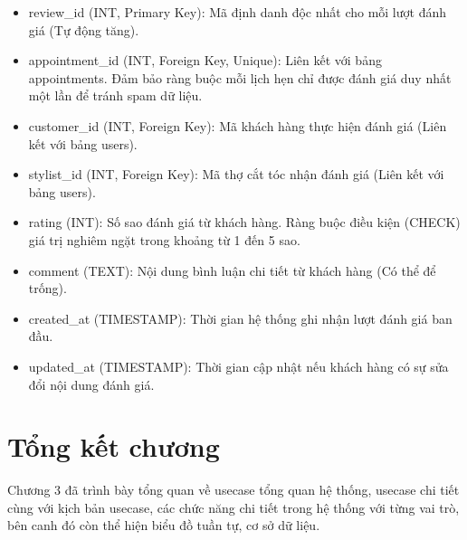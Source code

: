 \documentclass[../BTL.tex]{subfiles}
\begin{document}
\begin{itemize}
\item
  review\_id (INT, Primary Key): Mã định danh độc nhất cho mỗi lượt đánh
  giá (Tự động tăng).
\item
  appointment\_id (INT, Foreign Key, Unique): Liên kết với bảng
  appointments. Đảm bảo ràng buộc mỗi lịch hẹn chỉ được đánh giá duy
  nhất một lần để tránh spam dữ liệu.
\item
  customer\_id (INT, Foreign Key): Mã khách hàng thực hiện đánh giá
  (Liên kết với bảng users).
\item
  stylist\_id (INT, Foreign Key): Mã thợ cắt tóc nhận đánh giá (Liên
  kết với bảng users).
\item
  rating (INT): Số sao đánh giá từ khách hàng. Ràng buộc điều kiện
  (CHECK) giá trị nghiêm ngặt trong khoảng từ 1 đến 5 sao.
\item
  comment (TEXT): Nội dung bình luận chi tiết từ khách hàng (Có thể để
  trống).
\item
  created\_at (TIMESTAMP): Thời gian hệ thống ghi nhận lượt đánh giá
  ban đầu.
\item
  updated\_at (TIMESTAMP): Thời gian cập nhật nếu khách hàng có sự sửa
  đổi nội dung đánh giá.
\end{itemize}


\section{Tổng kết chương}
Chương 3 đã trình bày tổng quan về usecase tổng quan hệ thống, usecase
chi tiết cùng với kịch bản usecase, các chức năng chi tiết trong hệ
thống với từng vai trò, bên canh đó còn thể hiện biểu đồ tuần tự, cơ sở
dữ liệu.

\protect\hypertarget{_Toc225990067}{}{}\textbf{\hfill\break
}
\end{document}
